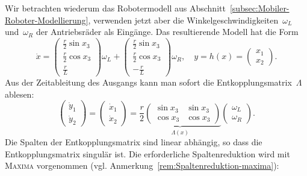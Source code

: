 \begin{example}
\label{exa:Roboter-MIMO-relativer-grad2}Wir betrachten wiederum das
Robotermodell aus Abschnitt~\ref{subsec:Mobiler-Roboter-Modellierung},
verwenden jetzt aber die Winkelgeschwindigkeiten~$\omega_{L}$ und~$\omega_{R}$
der Antriebsräder als Eingänge. Das resultierende Modell hat die Form
\begin{equation}
\dot{x}=\left(\begin{array}{c}
\frac{r}{2}\sin x_{3}\\
\frac{r}{2}\cos x_{3}\\
\frac{r}{L}
\end{array}\right)\omega_{L}+\left(\begin{array}{c}
\frac{r}{2}\sin x_{3}\\
\frac{r}{2}\cos x_{3}\\
-\frac{r}{L}
\end{array}\right)\omega_{R},\quad y=h(x)=\left(\begin{array}{c}
x_{1}\\
x_{2}
\end{array}\right).\label{eq:roboter-wl-wr}
\end{equation}
Aus der Zeitableitung des Ausgangs kann man sofort die Entkopplungsmatrix~$\Lambda$
ablesen:
\[
\left(\begin{array}{c}
\dot{y}_{1}\\
\dot{y}_{2}
\end{array}\right)=\left(\begin{array}{c}
\dot{x}_{1}\\
\dot{x}_{2}
\end{array}\right)=\underbrace{\frac{r}{2}\left(\begin{array}{cc}
\sin x_{3} & \sin x_{3}\\
\cos x_{3} & \cos x_{3}
\end{array}\right)}_{{\displaystyle \Lambda(x)}}\left(\begin{array}{c}
\omega_{L}\\
\omega_{R}
\end{array}\right).
\]
Die Spalten der Entkopplungsmatrix sind linear abhängig, so dass die
Entkopplungsmatrix singulär ist. Die erforderliche Spaltenreduktion
wird mit \textsc{Maxima} vorgenommen (vgl. Anmerkung~\ref{rem:Spaltenreduktion-maxima}):

\begin{maxima}\end{maxima}


\end{example}
